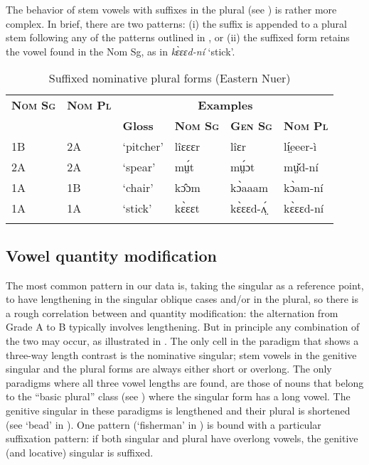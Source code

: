 \documentclass[output=paper,newtxmath,modfonts,nonflat,draftmode]{langsci/langscibook}
\begin{document}
The behavior of stem vowels with suffixes in the  plural (see ) is rather more complex. In brief, there are two patterns: (i) the suffix is appended to a plural stem following any of the patterns outlined in , or (ii) the suffixed form retains the vowel found in the Nom Sg, as in \textit{kɛ̀ɛɛd-ní} ‘stick’.


\begin{table}
\begin{tabularx}{\textwidth}{ll XXXX}
\lsptoprule

\bfseries\scshape Nom Sg & \bfseries\scshape Nom Pl & \multicolumn{4}{c}{\bfseries Examples}\\
\cmidrule{3-6}
&  & \bfseries Gloss & \bfseries\scshape Nom Sg & \bfseries\scshape Gen Sg & \bfseries\scshape Nom Pl\\
\midrule
1B & 2A & ‘pitcher’ & lîɛɛɛr & lîɛr & lí̤eeer-ì\\
2A & 2A & ‘spear’ & mṳ́t & mṳ́ɔt & mṳ̌d-ní\\
1A & 1B & ‘chair’ & kɔ̂ɔm & kɔ̀aaam & kɔ̀am-ní\\
1A & 1A & ‘stick’ & kɛ̀ɛɛt & kɛ̀ɛɛd-ʌ̤́ & kɛ̀ɛɛd-ní\\
\lspbottomrule
\end{tabularx}
\caption{Suffixed nominative plural forms (Eastern Nuer)}
\label{tab:monich:19}
\end{table}

\subsection{Vowel quantity modification} %
The most common pattern in our data is, taking the  singular as a reference point, to have lengthening in the singular oblique cases and/or in the plural, so there is a rough correlation between  and quantity modification: the alternation from Grade A to B typically involves lengthening. But in principle any combination of the two may occur, as illustrated in . The only cell in the paradigm that shows a three-way length contrast is the nominative singular; stem vowels in the genitive singular and the  plural forms are always either short or overlong. The only paradigms where all three vowel lengths are found, are those of nouns that belong to the “basic plural” class (see ) where the  singular form has a long vowel. The genitive singular in these paradigms is lengthened and their  plural is shortened (see ‘bead’ in ). One pattern (‘fisherman’ in ) is bound with a particular suffixation pattern:  if both  singular and plural have overlong vowels, the genitive (and locative) singular is suffixed. 
\end{document}
